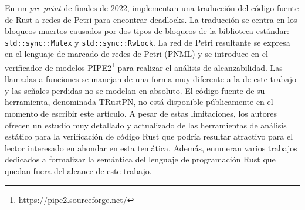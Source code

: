 En un \emph{pre-print} de finales de 2022, \cite{zhang2022deadlocks} implementan una traducción del
código fuente de Rust a redes de Petri para encontrar deadlocks. La traducción se
centra en los bloqueos muertos causados por dos tipos de bloqueos de la biblioteca estándar:
\texttt{std::sync::Mutex} y \texttt{std::sync::RwLock}.
La red de Petri resultante se expresa en el lenguaje de
marcado de redes de Petri (\acrfull{PNML}) y se introduce en el
verificador de modelos \acrfull{PIPE2}\footnote{\url{https://pipe2.sourceforge.net/}}
para realizar el análisis de alcanzabilidad.
Las llamadas a funciones se manejan de una forma muy diferente a la de este trabajo y las señales perdidas
no se modelan en absoluto. El código fuente de su herramienta, denominada TRustPN, no está
disponible públicamente en el momento de escribir este artículo. A pesar de estas limitaciones,
los autores ofrecen un estudio muy detallado y actualizado de las herramientas de análisis
estático para la verificación de código Rust que podría resultar atractivo para el lector interesado
en ahondar en esta temática. Además, enumeran varios trabajos dedicados a formalizar la semántica del lenguaje
de programación Rust que quedan fuera del alcance de este trabajo.